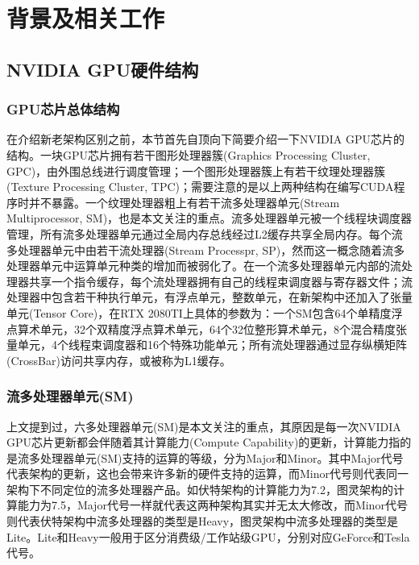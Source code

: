 \newpage
\section{背景及相关工作}
\setcounter{table}{0}
\setcounter{figure}{0}
\subsection{NVIDIA GPU硬件结构}
\subsubsection{GPU芯片总体结构} 
\par 在介绍新老架构区别之前，本节首先自顶向下简要介绍一下NVIDIA GPU芯片的结构。一块GPU芯片拥有若干图形处理器簇(Graphics Processing Cluster, GPC)，由外围总线进行调度管理；一个图形处理器簇上有若干纹理处理器簇(Texture Processing Cluster, TPC)；需要注意的是以上两种结构在编写CUDA程序时并不暴露。一个纹理处理器粗上有若干流多处理器单元(Stream Multiprocessor, SM)，也是本文关注的重点。流多处理器单元被一个线程块调度器管理，所有流多处理器单元通过全局内存总线经过L2缓存共享全局内存。每个流多处理器单元中由若干流处理器(Stream Processpr, SP)，然而这一概念随着流多处理器单元中运算单元种类的增加而被弱化了。在一个流多处理器单元内部的流处理器共享一个指令缓存，每个流处理器拥有自己的线程束调度器与寄存器文件；流处理器中包含若干种执行单元，有浮点单元，整数单元，在新架构中还加入了张量单元(Tensor Core)，在RTX 2080TI上具体的参数为：一个SM包含64个单精度浮点算术单元，32个双精度浮点算术单元，64个32位整形算术单元，8个混合精度张量单元，4个线程束调度器和16个特殊功能单元；所有流处理器通过显存纵横矩阵(CrossBar)访问共享内存，或被称为L1缓存\parencite{EXPLORING}。
\subsubsection{流多处理器单元(SM)} 
\par 上文提到过，六多处理器单元(SM)是本文关注的重点，其原因是每一次NVIDIA GPU芯片更新都会伴随着其计算能力(Compute Capability)的更新，计算能力指的是流多处理器单元(SM)支持的运算的等级，分为Major和Minor。其中Major代号代表架构的更新，这也会带来许多新的硬件支持的运算，而Minor代号则代表同一架构下不同定位的流多处理器产品。如伏特架构的计算能力为7.2，图灵架构的计算能力为7.5，Major代号一样就代表这两种架构其实并无太大修改，而Minor代号则代表伏特架构中流多处理器的类型是Heavy，图灵架构中流多处理器的类型是Lite。Lite和Heavy一般用于区分消费级/工作站级GPU，分别对应GeForce和Tesla代号。
